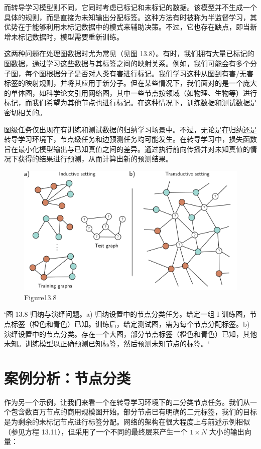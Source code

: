 而转导学习模型则不同，它同时考虑已标记和未标记的数据。该模型并不生成一个具体的规则，而是直接为未知输出分配标签。这种方法有时被称为半监督学习，其优势在于能够利用未标记数据中的模式来辅助决策。不过，它也存在缺点，即当新增未标记数据时，模型需要重新训练。

这两种问题在处理图数据时尤为常见（见图 13.8）。有时，我们拥有大量已标记的图数据，通过学习这些数据与其标签之间的映射关系。例如，我们可能会有多个分子图，每个图根据分子是否对人类有害进行标记。我们学习这种从图到有害/无害标签的映射规则，并将其应用于新分子。但在某些情况下，我们面对的是一个庞大的单体图，如科学论文引用网络图，其中一些节点按领域（如物理、生物等）进行标记，而我们希望为其他节点也进行标记。在这种情况下，训练数据和测试数据是密切相关的。

图级任务仅出现在有训练和测试数据的归纳学习场景中。不过，无论是在归纳还是转导学习环境下，节点级任务和边预测任务均可能发生。在转导学习中，损失函数旨在最小化模型输出与已知真值之间的差异。通过执行前向传播并对未知真值的情况下获得的结果进行预测，从而计算出新的预测结果。

\begin{figure}[ht!]
\centering
\includegraphics[width=0.7\linewidth]{png/chapter13/GraphInductiveTransductive.png}
\caption{Figure13.8}
\end{figure}

`图 13.8 归纳与演绎问题。a) 归纳设置中的节点分类任务。给定一组 I 训练图，节点标签（橙色和青色）已知。训练后，给定测试图，需为每个节点分配标签。b) 演绎设置中的节点分类。存在一个大图，部分节点标签（橙色和青色）已知，其他未知。训练模型以正确预测已知标签，然后预测未知节点的标签。`
\section{案例分析：节点分类}
作为另一个示例，让我们来看一个在转导学习环境下的二分类节点任务。我们从一个包含数百万节点的商用规模图开始。部分节点已有明确的二元标签，我们的目标是为剩余的未标记节点进行标签分配。网络的架构在很大程度上与前述示例相似（参见方程 13.11），但采用了一个不同的最终层来产生一个 \(1 \times N\) 大小的输出向量：

